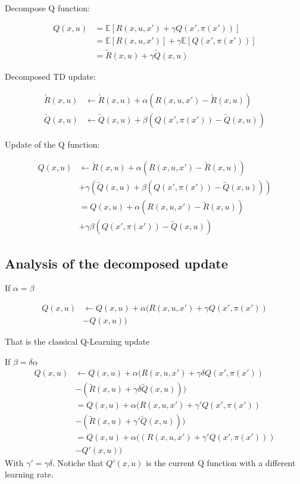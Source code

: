 \documentclass[conference]{IEEEtran}
\begin{document}
Decompose Q function:

\begin{align}
Q(x,u) & =\mathbb{E}\left[R(x,u,x')+\gamma Q(x',\pi(x'))\right] \nonumber\\ 
 & =\mathbb{E}\left[R(x,u,x')\right]+\gamma\mathbb{E}\left[Q(x',\pi(x'))\right] \nonumber\\
 & =\tilde{R}(x,u)+\gamma\tilde{Q}(x,u)
\end{align}

Decomposed TD update:

\begin{align}
\tilde{R}(x,u) & \leftarrow\tilde{R}(x,u)+\alpha(R(x,u,x')-\tilde{R}(x,u))\\
\tilde{Q}(x,u) & \leftarrow\tilde{Q}(x,u)+\beta(Q(x',\pi(x'))-\tilde{Q}(x,u))
\end{align}

Update of the Q function:

\begin{align}
Q(x,u) & \leftarrow\tilde{R}(x,u)+\alpha(R(x,u,x')-\tilde{R}(x,u)) \nonumber\\
 & +\gamma\left(\tilde{Q}(x,u)+\beta(Q(x',\pi(x'))-\tilde{Q}(x,u))\right) \nonumber\\
 & =Q(x,u)+\alpha(R(x,u,x')-\tilde{R}(x,u)) \nonumber\\
 & +\gamma\beta(Q(x',\pi(x'))-\tilde{Q}(x,u))
\end{align}

\subsection{Analysis of the decomposed update}
If $\alpha=\beta$

\begin{align}
Q(x,u) & \leftarrow Q(x,u)+\alpha(R(x,u,x')+\gamma Q(x',\pi(x')) \nonumber\\
 & -Q(x,u))
\end{align}

That is the classical Q-Learning update

If $\beta=\delta\alpha$
\begin{align}
Q(x,u) & \leftarrow Q(x,u)+\alpha(R(x,u,x')+\gamma\delta Q(x',\pi(x')) \nonumber\\
 & -(\tilde{R}(x,u)+\gamma\delta\tilde{Q}(x,u))) \nonumber\\
 & =Q(x,u)+\alpha(R(x,u,x')+\gamma'Q(x',\pi(x')) \nonumber\\
 & -(\tilde{R}(x,u)+\gamma'\tilde{Q}(x,u))) \nonumber\\
 & =Q(x,u)+\alpha((R(x,u,x')+\gamma'Q(x',\pi(x'))) \nonumber\\
 & -Q'(x,u))
\end{align}
With $\gamma'=\gamma\delta$. Notiche that $Q'(x,u)$ is the current Q function with a different learning rate.
\end{document}
